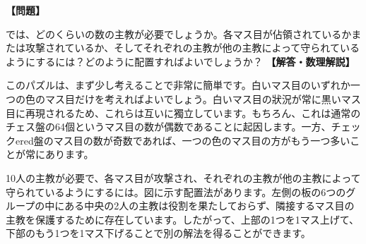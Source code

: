 \documentclass[10pt,a4paper,oneside,openany]{ltjsbook}
\begin{document}
\begin{tcolorbox}[colback=softblue,colframe=primaryblue,title=\textbf{第 298 問：主教が守られる （原題: BISHOPS--GUARDED.）},arc=2mm,boxrule=1pt,breakable]
\textbf{【問題】}\par\vspace{0.3em}
では、どのくらいの数の主教が必要でしょうか。各マス目が佔領されているかまたは攻撃されているか、そしてそれぞれの主教が他の主教によって守られているようにするには？どのように配置すればよいでしょうか？
\tcblower
\textbf{【解答・数理解説】}\par\vspace{0.3em}
このパズルは、まず少し考えることで非常に簡単です。白いマス目のいずれか一つの色のマス目だけを考えればよいでしょう。白いマス目の狀況が常に黒いマス目に再現されるため、これらは互いに獨立しています。もちろん、これは通常のチェス盤の64個というマス目の数が偶数であることに起因します。一方、チェックered盤のマス目の数が奇数であれば、一つの色のマス目の方がもう一つ多いことが常にあります。

10人の主教が必要で、各マス目が攻撃され、それぞれの主教が他の主教によって守られているようにするには。図に示す配置法があります。左側の板の6つのグループの中にある中央の2人の主教は役割を果たしておらず、隣接するマス目の主教を保護するために存在しています。したがって、上部の1つを1マス上げて、下部のもう1つを1マス下げることで別の解法を得ることができます。
\end{tcolorbox}
\end{document}
